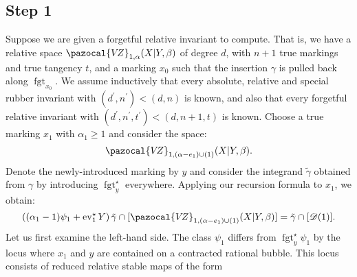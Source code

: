 \documentclass[11pt]{amsart}
\newcommand{\VZ}{\pazocal{V\!Z}}
\newcommand{\st}{\star}
\newcommand{\ev}{\operatorname{ev}}
\newcommand{\fgt}{\operatorname{fgt}}
\newcommand{\Dcal}{\mathcal{D}}
\theoremstyle{definition}
\theoremstyle{definition}
\begin{document}
\subsection*{Step 1} Suppose we are given a forgetful relative invariant to compute. That is, we have a relative space $\VZ_{1,\alpha}(X|Y,\beta)$ of degree $d$, with $n+1$ true markings and true tangency $t$, and a marking $x_0$ such that the insertion $\gamma$ is pulled back along $\fgt_{x_0}$. We assume inductively that every absolute, relative and special rubber invariant with $(d^\prime,n^\prime) < (d,n)$ is known, and also that every forgetful relative invariant with $(d^\prime,n^\prime,t^\prime) < (d,n+1,t)$ is known. Choose a true marking $x_1$ with $\alpha_1 \geq 1$ and consider the space:
\begin{equation*} \VZ_{1,(\alpha-e_1) \cup (1)}(X|Y,\beta). \end{equation*}
Denote the newly-introduced marking by $y$ and consider the integrand $\tilde\gamma$ obtained from $\gamma$ by introducing $\fgt_y^\st$ everywhere. Applying our recursion formula to $x_1$, we obtain:
\begin{equation}\label{step 1 recursion}\left( (\alpha_1-1)\psi_1 + \ev_1^\st Y\right) \tilde\gamma \cap [\VZ_{1,(\alpha-e_1) \cup (1)}(X|Y,\beta)] = \tilde\gamma \cap [\Dcal(1)].\end{equation}
Let us first examine the left-hand side. The class $\psi_1$ differs from $\fgt_y^\st \psi_1$ by the locus where $x_1$ and $y$ are contained on a contracted rational bubble. This locus consists of reduced relative stable maps of the form \medskip
\end{document}
